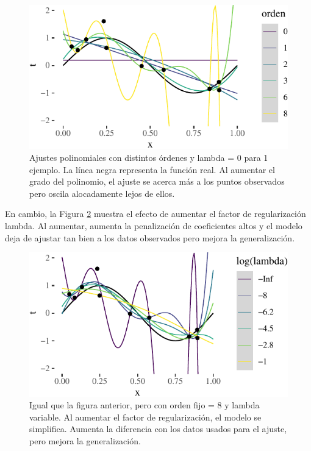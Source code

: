 \documentclass[]{tufte-handout}
\begin{document}
\begin{figure}
\includegraphics{README_files/figure-latex/ajustes-orden-1} \caption[Ajustes polinomiales con distintos órdenes y lambda = 0 para 1 ejemplo]{Ajustes polinomiales con distintos órdenes y lambda = 0 para 1 ejemplo. La línea negra representa la función real. Al aumentar el grado del polinomio, el ajuste se acerca más a los puntos observados pero oscila alocadamente lejos de ellos.}\label{fig:ajustes-orden}
\end{figure}

En cambio, la Figura \ref{fig:ajustes-lambda} muestra el efecto de aumentar el factor de regularización lambda. Al aumentar, aumenta la penalización de coeficientes altos y el modelo deja de ajustar tan bien a los datos observados pero mejora la generalización.

\begin{figure}
\includegraphics{README_files/figure-latex/ajustes-lambda-1} \caption[Igual que la figura anterior, pero con orden fijo = 8 y lambda variable]{Igual que la figura anterior, pero con orden fijo = 8 y lambda variable. Al aumentar el factor de regularización, el modelo se simplifica. Aumenta la diferencia con los datos usados para el ajuste, pero mejora la generalización.}\label{fig:ajustes-lambda}
\end{figure}
\end{document}
